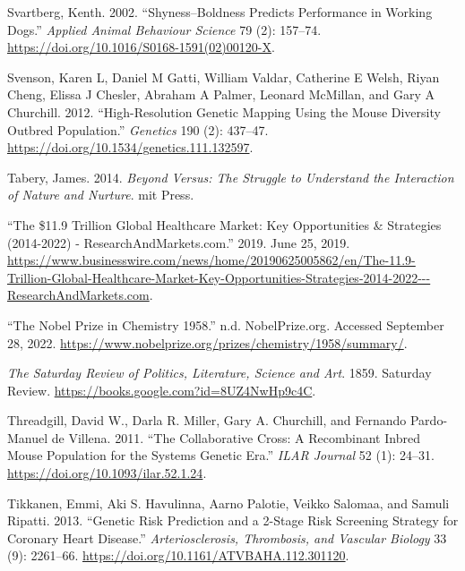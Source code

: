 \documentclass[
]{book}
\newlength{\cslhangindent}
\newlength{\cslentryspacingunit} %
\newenvironment{CSLReferences}[2] %
 {%
  \setlength{\parindent}{0pt}
  \ifodd #1
  \let\oldpar\par
  \def\par{\hangindent=\cslhangindent\oldpar}
  \fi
  \setlength{\parskip}{#2\cslentryspacingunit}
 }%
 {}
\begin{document}
\begin{CSLReferences}{1}{0}
\leavevmode{}%
Svartberg, Kenth. 2002. {``Shyness--Boldness Predicts Performance in Working Dogs.''} \emph{Applied Animal Behaviour Science} 79 (2): 157--74. \url{https://doi.org/10.1016/S0168-1591(02)00120-X}.

\leavevmode{}%
Svenson, Karen L, Daniel M Gatti, William Valdar, Catherine E Welsh, Riyan Cheng, Elissa J Chesler, Abraham A Palmer, Leonard McMillan, and Gary A Churchill. 2012. {``High-{Resolution Genetic Mapping Using} the {Mouse Diversity Outbred Population}.''} \emph{Genetics} 190 (2): 437--47. \url{https://doi.org/10.1534/genetics.111.132597}.

\leavevmode{}%
Tabery, James. 2014. \emph{Beyond Versus: {The} Struggle to Understand the Interaction of Nature and Nurture}. {mit Press}.

\leavevmode{}%
{``The \$11.9 {Trillion Global Healthcare Market}: {Key Opportunities} \& {Strategies} (2014-2022) - {ResearchAndMarkets}.com.''} 2019. June 25, 2019. \url{https://www.businesswire.com/news/home/20190625005862/en/The-11.9-Trillion-Global-Healthcare-Market-Key-Opportunities-Strategies-2014-2022---ResearchAndMarkets.com}.

\leavevmode{}%
{``The {Nobel Prize} in {Chemistry} 1958.''} n.d. {NobelPrize.org}. Accessed September 28, 2022. \url{https://www.nobelprize.org/prizes/chemistry/1958/summary/}.

\leavevmode{}%
\emph{The {Saturday Review} of {Politics}, {Literature}, {Science} and {Art}}. 1859. {Saturday Review}. \url{https://books.google.com?id=8UZ4NwHp9c4C}.

\leavevmode{}%
Threadgill, David W., Darla R. Miller, Gary A. Churchill, and Fernando Pardo-Manuel de Villena. 2011. {``The {Collaborative Cross}: {A Recombinant Inbred Mouse Population} for the {Systems Genetic Era}.''} \emph{ILAR Journal} 52 (1): 24--31. \url{https://doi.org/10.1093/ilar.52.1.24}.

\leavevmode{}%
Tikkanen, Emmi, Aki S. Havulinna, Aarno Palotie, Veikko Salomaa, and Samuli Ripatti. 2013. {``Genetic {Risk Prediction} and a 2-{Stage Risk Screening Strategy} for {Coronary Heart Disease}.''} \emph{Arteriosclerosis, Thrombosis, and Vascular Biology} 33 (9): 2261--66. \url{https://doi.org/10.1161/ATVBAHA.112.301120}.


\end{CSLReferences}
\end{document}
